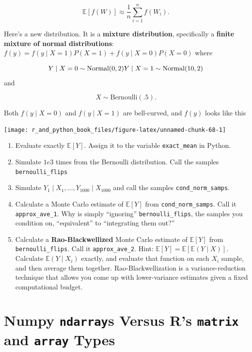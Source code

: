 \documentclass[
  12pt,
  krantz2]{krantz}
\begin{document}
\[
\mathbb{E}[f(W)] \approx \frac{1}{n}\sum_{i=1}^n f(W_i).
\]

Here's a new distribution. It is a \textbf{mixture distribution}, specifically a \textbf{finite mixture of normal distributions}: \(f(y) = f(y \mid X=1)P(X=1) + f(y \mid X=0)P(X=0)\) where

\[
Y \mid X=0 \sim \text{Normal}(0, 2) \\
Y \mid X=1 \sim \text{Normal}(10, 2)
\]
and

\[
X \sim \text{Bernoulli}(.5).
\]

Both \(f(y \mid X=0)\) and \(f(y \mid X=1)\) are bell-curved, and \(f(y)\) looks like this

\begin{center}\texttt{[image: r\_and\_python\_book\_files/figure-latex/unnamed-chunk-68-1]} \end{center}

\begin{enumerate}
\def\labelenumi{\alph{enumi}.}
\item
  Evaluate exactly \(\mathbb{E}[Y]\). Assign it to the variable \texttt{exact\_mean} in Python.
\item
  Simulate \(1e3\) times from the Bernoulli distribution. Call the samples \texttt{bernoulli\_flips}
\item
  Simulate \(Y_1 \mid X_1, \ldots, Y_{1000} \mid X_{1000}\) and call the samples \texttt{cond\_norm\_samps}.
\item
  Calculate a Monte Carlo estimate of \(\mathbb{E}[Y]\) from \texttt{cond\_norm\_samps}. Call it \texttt{approx\_ave\_1}. Why is simply ``ignoring'' \texttt{bernoulli\_flips}, the samples you condition on, ``equivalent'' to ``integrating them out?''
\item
  Calculate a \textbf{Rao-Blackwellized} Monte Carlo estimate of \(\mathbb{E}[Y]\) from \texttt{bernoulli\_flips}. Call it \texttt{approx\_ave\_2}. Hint: \(\mathbb{E}[Y] = \mathbb{E}[\mathbb{E}(Y \mid X) ]\). Calculate \(\mathbb{E}(Y \mid X_i)\) exactly, and evaluate that function on each \(X_i\) sample, and then average them together. Rao-Blackwellization is a variance-reduction technique that allows you come up with lower-variance estimates given a fixed computational budget.
\end{enumerate}

\hypertarget{numpy-ndarrays-versus-rs-matrix-and-array-types}{%
\chapter{\texorpdfstring{Numpy \texttt{ndarray}s Versus R's \texttt{matrix} and \texttt{array} Types}{Numpy ndarrays Versus R's matrix and array Types}}\label{numpy-ndarrays-versus-rs-matrix-and-array-types}}
\end{document}
